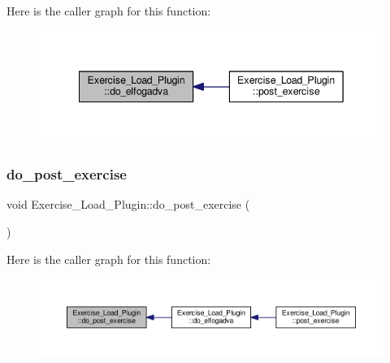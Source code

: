 Here is the caller graph for this function\+:\nopagebreak
\begin{figure}[H]
\begin{center}
\leavevmode
\includegraphics[width=342pt]{classExercise__Load__Plugin_af4de0753b05095fed82d7955a0e32cf8_icgraph}
\end{center}
\end{figure}
\mbox{\label{classExercise__Load__Plugin_a81e0284dc19303bfb0408cf14247ea9c}} 
\subsubsection{\texorpdfstring{do\+\_\+post\+\_\+exercise}{do\_post\_exercise}}
{\footnotesize\ttfamily void Exercise\+\_\+\+Load\+\_\+\+Plugin\+::do\+\_\+post\+\_\+exercise (\begin{DoxyParamCaption}\item[{Q\+Standard\+Item\+Model $\ast$}]{ }\end{DoxyParamCaption})\hspace{0.3cm}{\ttfamily [signal]}}

Here is the caller graph for this function\+:\nopagebreak
\begin{figure}[H]
\begin{center}
\leavevmode
\includegraphics[width=350pt]{classExercise__Load__Plugin_a81e0284dc19303bfb0408cf14247ea9c_icgraph}
\end{center}
\end{figure}
\mbox{\label{classExercise__Load__Plugin_ab2c84c55120579b1fdb135eb73694837}} 
